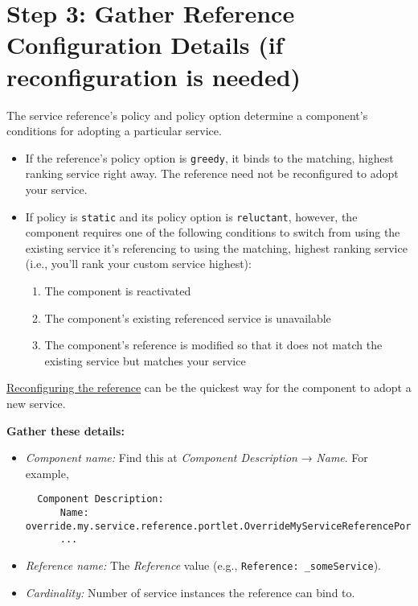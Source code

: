 \section{Step 3: Gather Reference Configuration Details (if
reconfiguration is
needed)}\label{step-3-gather-reference-configuration-details-if-reconfiguration-is-needed}

The service reference's policy and policy option determine a component's
conditions for adopting a particular service.

\begin{itemize}
\item
  If the reference's policy option is \texttt{greedy}, it binds to the
  matching, highest ranking service right away. The reference need not
  be reconfigured to adopt your service.
\item
  If policy is \texttt{static} and its policy option is
  \texttt{reluctant}, however, the component requires one of the
  following conditions to switch from using the existing service it's
  referencing to using the matching, highest ranking service (i.e.,
  you'll rank your custom service highest):

  \begin{enumerate}
  \def\labelenumi{\arabic{enumi}.}
  \tightlist
  \item
    The component is reactivated
  \item
    The component's existing referenced service is unavailable
  \item
    The component's reference is modified so that it does not match the
    existing service but matches your service
  \end{enumerate}
\end{itemize}

\href{/docs/7-2/customization/-/knowledge_base/c/reconfiguring-components-to-use-your-service}{Reconfiguring
the reference} can be the quickest way for the component to adopt a new
service.

\textbf{Gather these details:}

\begin{itemize}
\item
  \emph{Component name:} Find this at \emph{Component Description} →
  \emph{Name}. For example,

\begin{verbatim}
  Component Description:
      Name: override.my.service.reference.portlet.OverrideMyServiceReferencePortlet
      ...
\end{verbatim}
\item
  \emph{Reference name:} The \emph{Reference} value (e.g.,
  \texttt{Reference:\ \_someService}).
\item
  \emph{Cardinality:} Number of service instances the reference can bind
  to.
\end{itemize}

